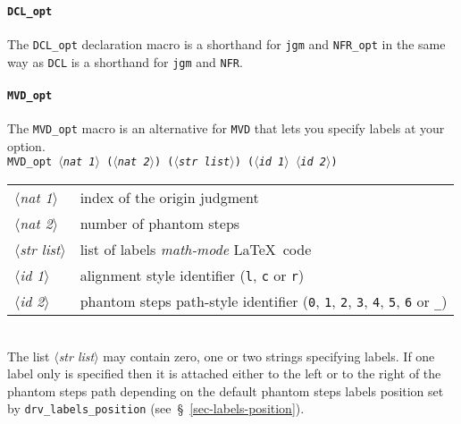 \documentclass[twoside,11pt]{article}
\newcommand{\param}[1]{\textrm{\textit{$\langle$#1\/$\rangle$}}}
\begin{document}
\paragraph{\texttt{DCL\_opt}}
%
%
The \texttt{DCL\_opt} declaration macro is a shorthand for \texttt{jgm} and
\texttt{NFR\_opt} in the same way as \texttt{DCL} is a shorthand for
\texttt{jgm} and \texttt{NFR}.
%
%
\paragraph{\texttt{MVD\_opt}}
%
%
The \texttt{MVD\_opt} macro is an alternative for \texttt{MVD} that lets you
specify labels at your option.\\[1ex]
\texttt{MVD\_opt \param{nat 1} (\param{nat 2})
(\param{str list}) (\param{id 1} \param{id 2})}\\
\begin{tabular}{ll}
\param{nat 1}&		index of the origin judgment\\
\param{nat 2}&		number of phantom steps\\
\param{str list}&	list of labels \emph{math-mode} \LaTeX\ code\\
\param{id 1}&		alignment style identifier ({\tt l}, {\tt c}
			or {\tt r})\\
\param{id 2}&		phantom steps path-style identifier ({\tt0}, {\tt1},
			{\tt2},	{\tt3},	{\tt4}, {\tt5}, {\tt6} or {\tt\_})
\end{tabular}\\[1ex]
The list \param{str list} may contain zero, one or two
strings specifying labels. If one label only is specified then it is attached
either to the left or to the right of the phantom steps path depending on the
default phantom steps labels position set by
\texttt{drv\_labels\_position} (see~\S~\ref{sec-labels-position}).
%
%
\end{document}
